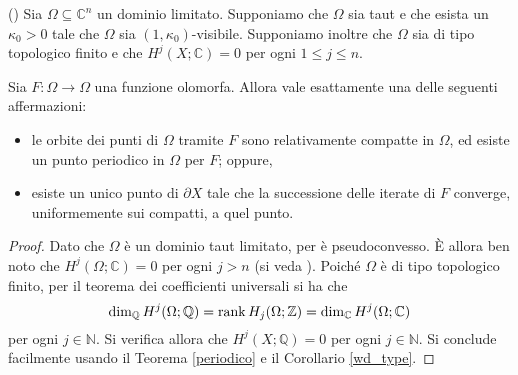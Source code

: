 \begin{cor}
    (\cite[Theorem 1.9]{BM}) Sia $\Omega\subseteq\mathbb{C}^n$ un dominio limitato. Supponiamo che $\Omega$ sia taut e che esista un $\kappa_0>0$ tale che $\Omega$ sia $(1,\kappa_0)$-visibile. Supponiamo inoltre che $\Omega$ sia di tipo topologico finito e che $H^j(X;\mathbb{C})=0$ per ogni $1\le j\le n$.

    Sia $F:\Omega\longrightarrow\Omega$ una funzione olomorfa. Allora vale esattamente una delle seguenti affermazioni:
    \begin{itemize}
        \item le orbite dei punti di $\Omega$ tramite $F$ sono relativamente compatte in $\Omega$, ed esiste un punto periodico in $\Omega$ per $F$; oppure,
        \item esiste un unico punto di $\partial X$ tale che la successione delle iterate di $F$ converge, uniformemente sui compatti, a quel punto.
    \end{itemize}
\end{cor}

\begin{proof}
    Dato che $\Omega$ è un dominio taut limitato, per \cite[Theorem F]{Wu} è pseudoconvesso. È allora ben noto che $H^j(\Omega;\mathbb{C})=0$ per ogni $j>n$ (si veda \cite[Theorema 4.2.7]{H}). Poiché $\Omega$ è di tipo topologico finito, per il teorema dei coefficienti universali si ha che
    $$\dim_{\mathbb{Q}}{H^j(\Omega;\mathbb{Q})}=\operatorname{rank}{H_j(\Omega;\mathbb{Z})}=\dim_{\mathbb{C}}{H^j(\Omega;\mathbb{C})}$$
    per ogni $j\in\mathbb{N}$. Si verifica allora che $H^j(X;\mathbb{Q})=0$ per ogni $j\in\mathbb{N}$. Si conclude facilmente usando il Teorema \ref{periodico} e il Corollario \ref{wd_type}.
\end{proof}